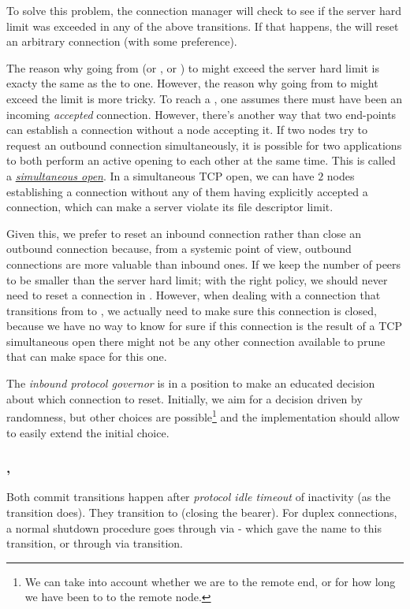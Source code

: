 To solve this problem, the connection manager will check
to see if the server hard limit was exceeded in any of the above transitions. If that happens, the \connmngr{} will reset an
arbitrary connection (with some preference).

The reason why going from \OutboundStateDupTau{} (or \OutboundStateDup{}, or
\OutboundIdleStateDup{}) to \InboundStateDup{} might exceed the server hard limit
is exacty the same as the \DuplexState{} to \InboundStateDup{} one.
However, the reason why going from \OutboundStateDupTau{} to \DuplexState{} might
exceed the limit is more tricky.  To reach a \DuplexState{}, one assumes there must
have been an incoming \textit{accepted} connection. However, there's another way that two
end-points can establish a connection without a node accepting it. If two nodes try
to request an outbound connection simultaneously, it is possible for two applications
to both perform an active opening to each other at the same time.  This is called a
\href{https://flylib.com/books/en/3.223.1.190/1/}{\textit{simultaneous open}}.
In a simultaneous TCP open, we can have $2$ nodes establishing a connection without any of
them having explicitly accepted a connection, which can make a server violate its file
descriptor limit.

Given this, we prefer to reset an inbound connection rather than close an outbound
connection because, from a systemic point of view, outbound connections are more
valuable than inbound ones. If we keep the number of \established{} peers to
be smaller than the server hard limit; with the right policy, we should never need
to reset a connection in \DuplexState{}. However, when dealing with a connection that
transitions from \OutboundStateDupTau{} to \DuplexState{}, we actually need to
make sure this connection is closed, because we have no way to know for sure
if this connection is the result of a TCP simultaneous open there might
not be any other connection available to prune that can make space for this one.

The \textit{inbound protocol governor} is in a position to make an educated
decision about which connection to reset. Initially, we aim for a decision driven by
randomness, but other choices are possible\footnote{We can take into account
whether we are \hot{} to the remote end, or for how long we have been \hot{} to
to the remote node.} and the implementation should allow to easily extend the
initial choice.


\subsubsection{\CommitUniRem{}, \CommitDupRem{}}\label{sec:tr_commit_rem}
Both commit transitions happen after \textit{protocol idle timeout} of
inactivity (as the \TimeoutExpired{} transition does). They transition to
\TerminatingState{} (closing the bearer). For duplex connections, a normal
shutdown procedure goes through \InboundIdleStateDup{}
via \CommitDupRem{} - which gave the name to this transition, or through
\OutboundIdleStateDup{} via \CommitDupLoc{} transition.

